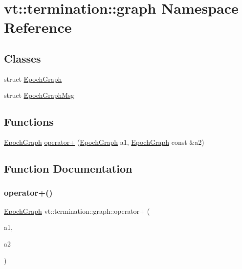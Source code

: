 \hypertarget{namespacevt_1_1termination_1_1graph}{}\section{vt\+:\+:termination\+:\+:graph Namespace Reference}
\label{namespacevt_1_1termination_1_1graph}
\subsection*{Classes}
\begin{DoxyCompactItemize}
\item 
struct \hyperlink{structvt_1_1termination_1_1graph_1_1_epoch_graph}{Epoch\+Graph}
\item 
struct \hyperlink{structvt_1_1termination_1_1graph_1_1_epoch_graph_msg}{Epoch\+Graph\+Msg}
\end{DoxyCompactItemize}
\subsection*{Functions}
\begin{DoxyCompactItemize}
\item 
\hyperlink{structvt_1_1termination_1_1graph_1_1_epoch_graph}{Epoch\+Graph} \hyperlink{namespacevt_1_1termination_1_1graph_a74ce4a70b2fd8b617f8dff94667cb733}{operator+} (\hyperlink{structvt_1_1termination_1_1graph_1_1_epoch_graph}{Epoch\+Graph} a1, \hyperlink{structvt_1_1termination_1_1graph_1_1_epoch_graph}{Epoch\+Graph} const \&a2)
\end{DoxyCompactItemize}


\subsection{Function Documentation}
\mbox{\label{namespacevt_1_1termination_1_1graph_a74ce4a70b2fd8b617f8dff94667cb733}} 
\subsubsection{\texorpdfstring{operator+()}{operator+()}}
{\footnotesize\ttfamily \hyperlink{structvt_1_1termination_1_1graph_1_1_epoch_graph}{Epoch\+Graph} vt\+::termination\+::graph\+::operator+ (\begin{DoxyParamCaption}\item[{\hyperlink{structvt_1_1termination_1_1graph_1_1_epoch_graph}{Epoch\+Graph}}]{a1,  }\item[{\hyperlink{structvt_1_1termination_1_1graph_1_1_epoch_graph}{Epoch\+Graph} const \&}]{a2 }\end{DoxyParamCaption})}

